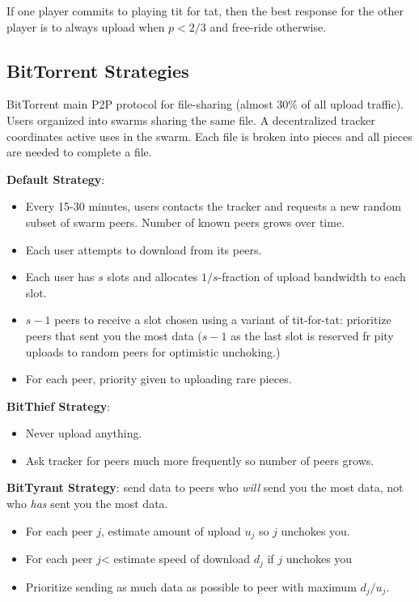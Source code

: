 \documentclass[dvipsnames]{article}
\theoremstyle{definition}
\theoremstyle{remark}
\begin{document}
If one player commits to playing tit for tat, then the best response for the other player is to always upload when $p < 2/3$ and free-ride otherwise. 

\subsection{BitTorrent Strategies}

BitTorrent main P2P protocol for file-sharing (almost 30\% of all upload traffic). Users organized into swarms sharing the same file. A decentralized tracker coordinates active uses in the swarm. Each file is broken into pieces and all pieces are needed to complete a file.

\textbf{Default Strategy}:
\begin{itemize}
	\item Every 15-30 minutes, users contacts the tracker and requests a new random subset of swarm peers. Number of known peers grows over time. 
	\item Each user attempts to download from its peers.
	\item Each user has $s$ slots and allocates $1/s$-fraction of upload bandwidth to each slot.
	\item $s-1$ peers to receive a slot chosen using a variant of tit-for-tat: prioritize peers that sent you the most data ($s-1$ as the last slot is reserved fr pity uploads to random peers for optimistic unchoking.)
	\item For each peer, priority given to uploading rare pieces. 
\end{itemize} 

\textbf{BitThief Strategy}:
\begin{itemize}
	\item Never upload anything.
	\item Ask tracker for peers much more frequently so number of peers grows.
\end{itemize}

\textbf{BitTyrant Strategy}: send data to peers who \textit{will} send you the most data, not who \textit{has} sent you the most data.
\begin{itemize}
	\item For each peer $j$, estimate amount of upload $u_j$ so $j$ unchokes you.
	\item For each peer $j$< estimate speed of download $d_j$ if $j$ unchokes you
	\item Prioritize sending as much data as possible to peer with maximum $d_j/u_j$.
\end{itemize}
\end{document}

